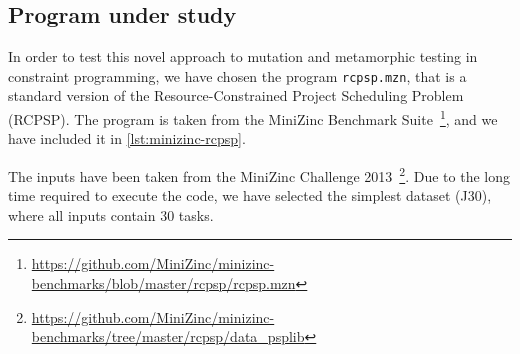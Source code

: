 \subsection{Program under study}
In order to test this novel approach to mutation and metamorphic
testing in constraint programming, we have chosen the program
\lstinline|rcpsp.mzn|, that is a standard version of
the Resource-Constrained Project Scheduling Problem (RCPSP). The
program is taken from the MiniZinc Benchmark
Suite~\footnote{\url{https://github.com/MiniZinc/minizinc-benchmarks/blob/master/rcpsp/rcpsp.mzn}},
and we have included it in \ref{lst:minizinc-rcpsp}.

The inputs have been taken from the MiniZinc Challenge
2013~\footnote{\url{https://github.com/MiniZinc/minizinc-benchmarks/tree/master/rcpsp/data_psplib}}. Due
to the long time required to execute the code, we have selected the simplest
dataset (J30), where all inputs contain 30 tasks.

